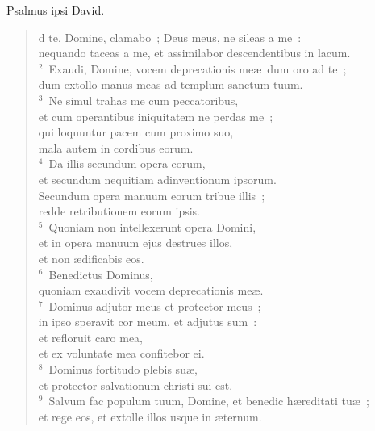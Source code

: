 \bchapter[Psalm]
Psalmus ipsi David. \begin{verse}d te, Domine, clamabo~; Deus meus, ne sileas a me~:\\ nequando taceas a me, et assimilabor descendentibus in lacum.\\
${}^{2}$~Exaudi, Domine, vocem deprecationis me\ae\ dum oro ad te~;\\ dum extollo manus meas ad templum sanctum tuum.\\
${}^{3}$~Ne simul trahas me cum peccatoribus,\\ et cum operantibus iniquitatem ne perdas me~;\\ qui loquuntur pacem cum proximo suo,\\ mala autem in cordibus eorum.\\
${}^{4}$~Da illis secundum opera eorum,\\ et secundum nequitiam adinventionum ipsorum.\\ Secundum opera manuum eorum tribue illis~;\\ redde retributionem eorum ipsis.\\
${}^{5}$~Quoniam non intellexerunt opera Domini,\\ et in opera manuum ejus destrues illos,\\ et non \ae dificabis eos.\\
${}^{6}$~Benedictus Dominus,\\ quoniam exaudivit vocem deprecationis me\ae .\\
${}^{7}$~Dominus adjutor meus et protector meus~;\\ in ipso speravit cor meum, et adjutus sum~:\\ et refloruit caro mea,\\ et ex voluntate mea confitebor ei.\\
${}^{8}$~Dominus fortitudo plebis su\ae ,\\ et protector salvationum christi sui est.\\
${}^{9}$~Salvum fac populum tuum, Domine, et benedic h\ae reditati tu\ae~;\\ et rege eos, et extolle illos usque in \ae ternum.\end{verse}



